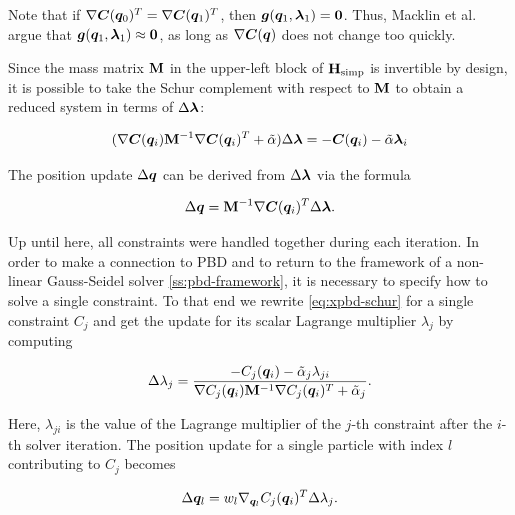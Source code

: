 \noindent Note that if $\nabla \bm{C}(\bm{q}_0)^T = \nabla \bm{C}(\bm{q}_1)^T$, then 
$\bm{g}(\bm{q}_1, \bm{\lambda}_1) = \bm{0}$. Thus, Macklin et al.\ \cite{macklin2016} argue that 
$\bm{g}(\bm{q}_1, \bm{\lambda}_1) \approx \bm{0}$, as long as $\nabla \bm{C}(\bm{q})$ 
does not change too quickly.

Since the mass matrix $\mathbf{M}$ in the upper-left block of $\mathbf{H}_{\text{simp}}$ is invertible by design, it is possible
to take the Schur complement with respect to $\mathbf{M}$ to obtain a reduced system in terms of $\Delta \bm{\lambda}$:

\begin{equation}\label{eq:xpbd-schur}
    (\nabla \bm{C}(\bm{q}_i) \mathbf{M}^{-1} \nabla \bm{C}(\bm{q}_i)^T + \tilde{\mathbf{\alpha}}) \Delta \bm{\lambda} = -\bm{C}(\bm{q}_i) - 
    \tilde{\mathbf{\alpha}}\bm{\lambda}_i
\end{equation}

\noindent The position update $\Delta \bm{q}$ can be derived from $\Delta \bm{\lambda}$ via the formula

\begin{equation}\label{eq:xpbd-position-update}
    \Delta \bm{q} = \mathbf{M}^{-1} \nabla \bm{C}(\bm{q}_i)^T \Delta \bm{\lambda}.
\end{equation}

Up until here, all constraints were handled together during each iteration. In order to make a connection to PBD and to return to the framework of a
non-linear Gauss-Seidel solver \cref{ss:pbd-framework}, it is necessary to specify how to solve a single constraint. To that end we rewrite 
\autoref{eq:xpbd-schur} for a single constraint $C_j$ and get the update for its scalar Lagrange multiplier $\lambda_j$ by computing

\begin{equation}\label{eq:xpbd-lambda-j}
    \Delta \lambda_j = \frac{-C_j(\bm{q}_i) - \tilde{\alpha}_j \lambda_{ji}}{\nabla C_j(\bm{q}_i) \mathbf{M}^{-1} \nabla C_j(\bm{q}_i)^T + \tilde{\alpha}_j}.
\end{equation}

\noindent Here, $\lambda_{ji}$ is the value of the Lagrange multiplier of the $j$-th constraint after the $i$-th solver iteration. The position update for 
a single particle with index $l$ contributing to $C_j$ becomes

\begin{equation}\label{eq:xpbd-position-update-i}
    \Delta \bm{q}_l = w_l \nabla_{\bm{q}_l} C_j(\bm{q}_i)^T \Delta \lambda_j.
\end{equation}

